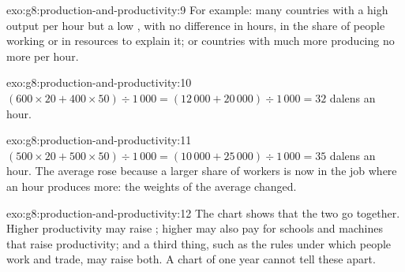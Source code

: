 \begin{solution}{exo:g8:production-and-productivity:9}
For example: many countries with a high output per hour but a low , with no
difference in hours, in the share of people working or in resources to explain it; or countries
with much more  producing no more per hour.
\end{solution}

\begin{solution}{exo:g8:production-and-productivity:10}
$(600 \times 20 + 400 \times 50) \div 1\,000 = (12\,000 + 20\,000) \div 1\,000 = 32$ dalens an hour.
\end{solution}

\begin{solution}{exo:g8:production-and-productivity:11}
$(500 \times 20 + 500 \times 50) \div 1\,000 = (10\,000 + 25\,000) \div 1\,000 = 35$ dalens an hour.
The average rose because a larger share of workers is now in the job where an hour produces more:
the weights of the average changed.
\end{solution}

\begin{solution}{exo:g8:production-and-productivity:12}
The chart shows that the two go together. Higher productivity may raise ; higher  may
also pay for schools and machines that raise productivity; and a third thing, such as the rules
under which people work and trade, may raise both. A chart of one year cannot tell these apart.
\end{solution}

